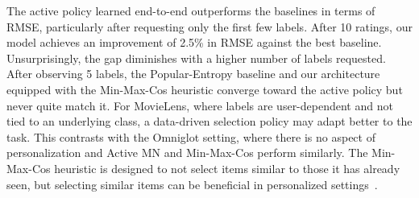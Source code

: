 The active policy learned end-to-end outperforms the baselines in terms of RMSE, particularly after requesting only the first few labels.
After 10 ratings, our model achieves an improvement of 2.5\% in RMSE against the best baseline.
Unsurprisingly, the gap diminishes with a higher number of labels requested.
After observing 5 labels, the Popular-Entropy baseline and our architecture equipped with the Min-Max-Cos heuristic converge toward the active policy but never quite match it.
For MovieLens, where labels are user-dependent and not tied to an underlying class, a data-driven selection policy may adapt better to the task.
This contrasts with the Omniglot setting, where there is no aspect of personalization and Active MN and Min-Max-Cos perform similarly.
The Min-Max-Cos heuristic is designed to not select items similar to those it has already seen, but selecting similar items can be beneficial in personalized settings~\cite{elahi2016survey}.

